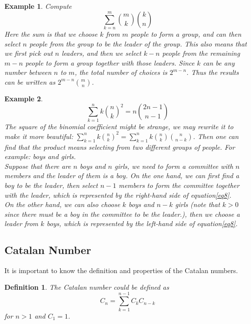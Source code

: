 \documentclass{article}
\newtheorem{definition}{Definition}[section]
\newtheorem{example}{Example}[section]
\begin{document}
    \begin{example}
        Compute
        \begin{equation}
            \sum^m_{k=n}\binom{m}{k}\binom{k}{n}
        \end{equation}
        Here the sum is that we choose $k$ from $m$ people to form a group, and can then select $n$ people from the group to be the leader of the group. This also means that we first pick out $n$ leaders, and then we select $k-n$ people from the remaining $m-n$ people to form a group together with those leaders. Since $k$ can be any number between $n$ to $m$, the total number of choices is $2^{m-n}$. Thus the results can be written as $2^{m-n}\binom{m}{n}$.
    \end{example}

    \begin{example}
        \begin{equation}\label{eq8}
            \sum^n_{k=1}k\binom{n}{k}^2=n\binom{2n-1}{n-1}
        \end{equation}
        The square of the binomial coefficient might be strange, we may rewrite it to make it more beautiful: $\sum^n_{k=1}k\binom{n}{k}^2=\sum^n_{k=1}k\binom{n}{k}\binom{n}{n-k}$. Then one can find that the product means selecting from two different groups of people. For example: boys and girls.\\
        
        Suppose that there are $n$ boys and $n$ girls, we need to form a committee with $n$ members and the leader of them is a boy. On the one hand, we can first find a boy to be the leader, then select $n-1$ members to form the committee together with the leader, which is represented by the right-hand side of equation\eqref{eq8}.\\
        
        On the other hand, we can also choose $k$ boys and $n-k$ girls (note that $k>0$ since there must be a boy in the committee to be the leader.), then we choose a leader from $k$ boys, which is represented by the left-hand side of equation\eqref{eq8}.
    \end{example}

    \subsection{Catalan Number}
        It is important to know the definition and properties of the Catalan numbers.
        \begin{definition}
            The Catalan number could be defined as 
            \begin{equation}
                C_n=\sum^{n-1}_{k=1}C_{k}C_{n-k}
            \end{equation}
            for $n>1$ and $C_1=1$.
        \end{definition}
\end{document}
